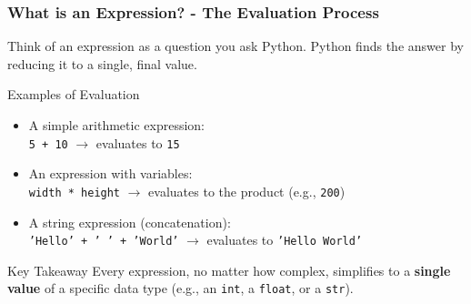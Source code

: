\documentclass{beamer}
\begin{document}
\begin{frame}[fragile]
    \frametitle{What is an Expression? - The Evaluation Process}

    Think of an expression as a question you ask Python. Python finds the answer by reducing it to a single, final value.

    \begin{block}{Examples of Evaluation}
        \begin{itemize}
            \item A simple arithmetic expression: \\
            \texttt{5 + 10} \quad $\rightarrow$ \quad evaluates to \quad \texttt{15}

            \vspace{1em}

            \item An expression with variables: \\
            \texttt{width * height} \quad $\rightarrow$ \quad evaluates to the product (e.g., \texttt{200})

            \vspace{1em}

            \item A string expression (concatenation): \\
            \texttt{'Hello' + ' ' + 'World'} \quad $\rightarrow$ \quad evaluates to \quad \texttt{'Hello World'}
        \end{itemize}
    \end{block}

    \vfill

    \begin{alertblock}{Key Takeaway}
        Every expression, no matter how complex, simplifies to a \textbf{single value} of a specific data type (e.g., an \texttt{int}, a \texttt{float}, or a \texttt{str}).
    \end{alertblock}

\end{frame}
\end{document}
